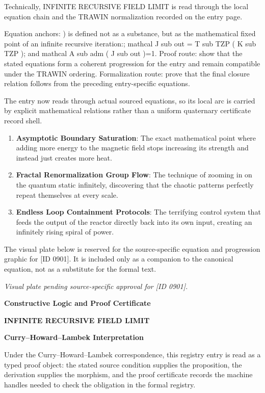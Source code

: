 Technically, INFINITE RECURSIVE FIELD LIMIT is read through the local equation chain and the TRAWIN normalization recorded on the entry page.

Equation anchors: ) is defined not as a substance, but as the mathematical fixed point of an infinite recursive iteration:; mathcal J sub out = T sub TZP ( K sub TZP ); and mathcal A sub adm ( J sub out )=1. Proof route: show that the stated equations form a coherent progression for the entry and remain compatible under the TRAWIN ordering. Formalization route: prove that the final closure relation follows from the preceding entry-specific equations.

The entry now reads through actual sourced equations, so its local arc is carried by explicit mathematical relations rather than a uniform quaternary certificate record shell.
\endgroup

\begin{enumerate}[leftmargin=1.6em,itemsep=6pt,topsep=4pt]
\item \textbf{Asymptotic Boundary Saturation}: The exact mathematical point where adding more energy to the magnetic field stops increasing its strength and instead just creates more heat.
\item \textbf{Fractal Renormalization Group Flow}: The technique of zooming in on the quantum static infinitely, discovering that the chaotic patterns perfectly repeat themselves at every scale.
\item \textbf{Endless Loop Containment Protocols}: The terrifying control system that feeds the output of the reactor directly back into its own input, creating an infinitely rising spiral of power.
\end{enumerate}

\begingroup\footnotesize\sloppy
The visual plate below is reserved for the source-specific equation and progression graphic for [ID 0901]. It is included only as a companion to the canonical equation, not as a substitute for the formal text.
\par\endgroup
\begingroup\footnotesize\itshape
Visual plate pending source-specific approval for [ID 0901].
\par\endgroup

\clearpage
\begingroup\tzpsupportsetup
\noindent\textbf{\fontsize{10.8pt}{12.8pt}\selectfont [ID 0901] Constructive Logic and Proof Certificate}\par
\noindent\textbf{\fontsize{10pt}{12pt}\selectfont INFINITE RECURSIVE FIELD LIMIT}\par
\vspace{0.45em}
\begingroup
\footnotesize
\setlength{\parskip}{0.22em}
\setlength{\parindent}{0pt}
\noindent\textbf{Curry--Howard--Lambek Interpretation}\par
Under the Curry--Howard--Lambek correspondence, this registry entry is read as a typed proof
object: the stated source condition supplies the proposition, the derivation supplies the
morphism, and the proof certificate records the machine handles needed to check the obligation
in the formal registry.

